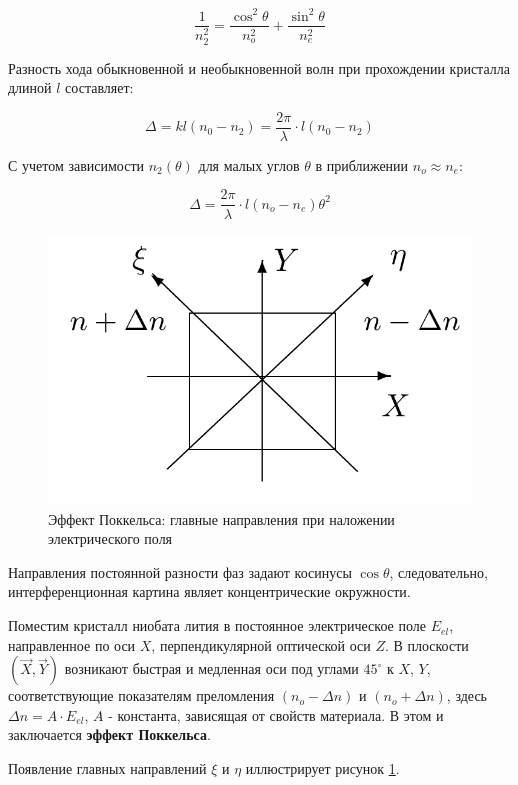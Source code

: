 \documentclass[12pt]{kiarticle}
\begin{document}
	\[ \frac{1}{n_2^2} = \frac{\cos^2\theta}{n_o^2} + \frac{\sin^2\theta}{n_e^2} \]
	
	Разность хода обыкновенной и необыкновенной волн при прохождении кристалла длиной $l$ составляет: 
	
	\[ \Delta = kl(n_0 - n_2) = \frac{2\pi}{\lambda} \cdot l (n_0 - n_2) \]
	
	С учетом зависимости $n_2(\theta)$ для малых углов $\theta$ в приближении $n_o \approx n_e$: 
	
	\begin{equation}
		\Delta = \frac{2\pi}{\lambda}\cdot l (n_o - n_e)\theta^2 
	\end{equation}
	
	\begin{figure} 
		\includegraphics[width=\linewidth]{maindir}
		\caption{Эффект Поккельса: главные направления при наложении электрического поля}
		\label{dir}
	\end{figure}
	
	Направления постоянной разности фаз задают косинусы $\cos\theta$, следовательно, интерференционная картина являет концентрические окружности. 
	
	Поместим кристалл ниобата лития в постоянное электрическое поле $E_{el}$, направленное по оси $X$, перпендикулярной оптической оси $Z$. В плоскости $(\overrightarrow{X}, \overrightarrow{Y})$ возникают быстрая и медленная оси под углами $45^\circ$ к $X$, $Y$, соответствующие показателям преломления $(n_o - \Delta n)$ и $(n_o + \Delta n)$, здесь $\Delta n = A\cdot E_{el}$, $A$ - константа, зависящая от свойств материала. В этом и заключается \textbf{эффект Поккельса}. 
	
	Появление главных направлений $\xi$ и $\eta$ иллюстрирует рисунок \ref{dir}. 
	
\end{document}
